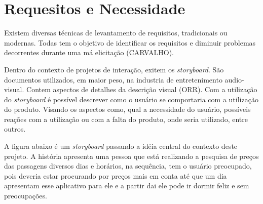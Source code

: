 \chapter[Requesitos e Necessidade]{Requesitos e Necessidade}

Existem diversas técnicas de levantamento de requisitos, tradicionais ou modernas. Todas tem o objetivo de identificar os requisitos e diminuir problemas decorrentes durante uma má elicitação (CARVALHO).

Dentro do contexto de projetos de interação, exitem os \textit{storyboard}. São documentos utilizados, em maior peso, na industria de entretenimento audio-visual. Contem aspectos de detalhes da descrição visual (ORR). Com a utilização do \textit{storyboard} é possível descrever como o usuário se comportaria com a utilização do produto. Visando os aspectos como, qual a necessidade do usuário, possíveis reações com a utilização ou com a falta do produto, onde seria utilizado, entre outros.

A figura abaixo é um \textit{storyboard} passando a idéia central do contexto deste projeto. A história apresenta uma pessoa que está realizando a pesquisa de preços das passagens diversos  dias e horários, na sequência, tem o usuário preocupado, pois deveria estar procurando por preços mais em conta até que um dia apresentam esse aplicativo para ele e a partir dai ele pode ir dormir feliz e sem preocupações.

